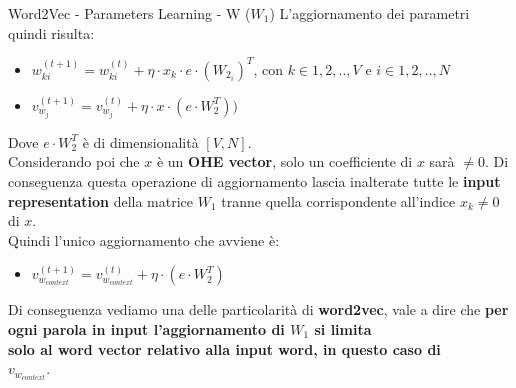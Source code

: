 \documentclass[british]{beamer}
\begin{document}
\begin{frame}{Word2Vec - Parameters Learning - W (\(W_1\))}
	L'aggiornamento dei parametri quindi risulta:
	\begin{itemize}
		\item \( w_{ki}^{(t+1)} = w_{ki}^{(t)} + \eta\cdot x_k \cdot e \cdot (W_{2_{i}})^T\), con \(k \in {1,2,..,V}\) e \(i \in {1,2,..,N}\)
		\item \( v_{w_{j}}^{(t+1)} = v_{w_{j}}^{(t)} + \eta\cdot x \cdot \left( e \cdot W_{2}^T \right) )\)
	\end{itemize}
	Dove \(e \cdot W_2^T\) \`{e} di dimensionalit\`{a} \([V,N]\).\\
	Considerando poi che \(x\) \`{e} un \textbf{OHE vector}, solo un coefficiente di \(x\) sar\`{a} \(\neq 0\).
	Di conseguenza questa operazione di aggiornamento lascia inalterate tutte le \textbf{input representation} della matrice \textbf{\(W_1\)} tranne quella corrispondente all'indice \(x_k \neq0\) di \(x\). \\
	Quindi l'unico aggiornamento che avviene \`{e}:
	\begin{itemize}
		\item \( v_{w_{context}}^{(t+1)} = v_{w_{context}}^{(t)} + \eta\cdot \left(e \cdot W_{2}^T\right)\)
	\end{itemize}
	Di conseguenza vediamo una delle particolarit\`{a} di \textbf{word2vec}, vale a dire che \textbf{per ogni parola in input l'aggiornamento di \(W_1\) si limita \\solo al word vector relativo alla input word, in questo caso di\\ \(v_{w_{context}}\)}. 
\end{frame}
\end{document}
